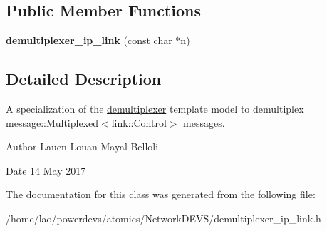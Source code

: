 \subsection*{Public Member Functions}
\begin{DoxyCompactItemize}
\item 
{\bfseries demultiplexer\+\_\+ip\+\_\+link} (const char $\ast$n)\hypertarget{classdemultiplexer__ip__link_aec9879ae23d1a8c51d7d73f9c8b3e2a5}{}\label{classdemultiplexer__ip__link_aec9879ae23d1a8c51d7d73f9c8b3e2a5}

\end{DoxyCompactItemize}


\subsection{Detailed Description}
A specialization of the \hyperlink{classdemultiplexer}{demultiplexer} template model to demultiplex message\+::\+Multiplexed$<$link\+::\+Control$>$ messages. 

\begin{DoxyAuthor}{Author}
Lauen Louan Mayal Belloli 
\end{DoxyAuthor}
\begin{DoxyDate}{Date}
14 May 2017 
\end{DoxyDate}


The documentation for this class was generated from the following file\+:\begin{DoxyCompactItemize}
\item 
/home/lao/powerdevs/atomics/\+Network\+D\+E\+V\+S/demultiplexer\+\_\+ip\+\_\+link.\+h\end{DoxyCompactItemize}
